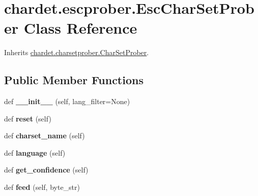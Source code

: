 \hypertarget{classchardet_1_1escprober_1_1_esc_char_set_prober}{}\section{chardet.\+escprober.\+Esc\+Char\+Set\+Prober Class Reference}
\label{classchardet_1_1escprober_1_1_esc_char_set_prober}


Inherits \hyperlink{classchardet_1_1charsetprober_1_1_char_set_prober}{chardet.\+charsetprober.\+Char\+Set\+Prober}.

\subsection*{Public Member Functions}
\begin{DoxyCompactItemize}
\item 
\mbox{\label{classchardet_1_1escprober_1_1_esc_char_set_prober_aa4bc6acce66971dd03e8226e34dff4ac}} 
def {\bfseries \+\_\+\+\_\+init\+\_\+\+\_\+} (self, lang\+\_\+filter=None)
\item 
\mbox{\label{classchardet_1_1escprober_1_1_esc_char_set_prober_a68f47728ca3f221bcec1414d4ebb6ff3}} 
def {\bfseries reset} (self)
\item 
\mbox{\label{classchardet_1_1escprober_1_1_esc_char_set_prober_a2abac67bc38bba8da4ce77ca147120ea}} 
def {\bfseries charset\+\_\+name} (self)
\item 
\mbox{\label{classchardet_1_1escprober_1_1_esc_char_set_prober_acd5c91db5664f5f07dd25ebaea7fccbb}} 
def {\bfseries language} (self)
\item 
\mbox{\label{classchardet_1_1escprober_1_1_esc_char_set_prober_a5c286c7826e97ceaf47ed09b9a51d911}} 
def {\bfseries get\+\_\+confidence} (self)
\item 
\mbox{\label{classchardet_1_1escprober_1_1_esc_char_set_prober_acb01be26310064122ebf1830cec08642}} 
def {\bfseries feed} (self, byte\+\_\+str)
\end{DoxyCompactItemize}
